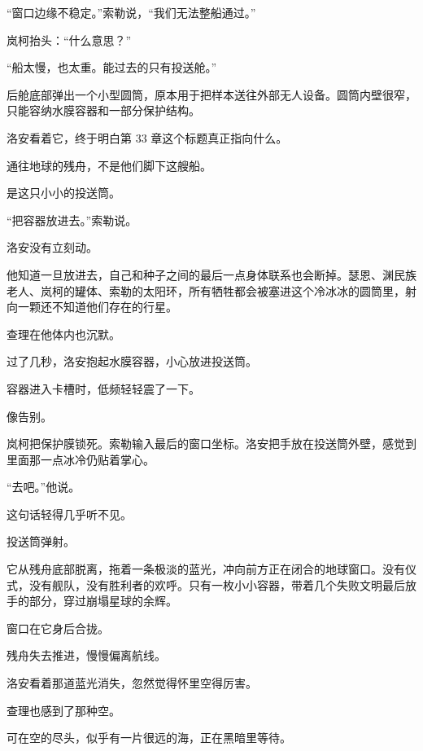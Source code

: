 “窗口边缘不稳定。”索勒说，“我们无法整船通过。”

岚柯抬头：“什么意思？”

“船太慢，也太重。能过去的只有投送舱。”

后舱底部弹出一个小型圆筒，原本用于把样本送往外部无人设备。圆筒内壁很窄，只能容纳水膜容器和一部分保护结构。

洛安看着它，终于明白第 33 章这个标题真正指向什么。

通往地球的残舟，不是他们脚下这艘船。

是这只小小的投送筒。

“把容器放进去。”索勒说。

洛安没有立刻动。

他知道一旦放进去，自己和种子之间的最后一点身体联系也会断掉。瑟恩、渊民族老人、岚柯的罐体、索勒的太阳环，所有牺牲都会被塞进这个冷冰冰的圆筒里，射向一颗还不知道他们存在的行星。

查理在他体内也沉默。

过了几秒，洛安抱起水膜容器，小心放进投送筒。

容器进入卡槽时，低频轻轻震了一下。

像告别。

岚柯把保护膜锁死。索勒输入最后的窗口坐标。洛安把手放在投送筒外壁，感觉到里面那一点冰冷仍贴着掌心。

“去吧。”他说。

这句话轻得几乎听不见。

投送筒弹射。

它从残舟底部脱离，拖着一条极淡的蓝光，冲向前方正在闭合的地球窗口。没有仪式，没有舰队，没有胜利者的欢呼。只有一枚小小容器，带着几个失败文明最后放手的部分，穿过崩塌星球的余辉。

窗口在它身后合拢。

残舟失去推进，慢慢偏离航线。

洛安看着那道蓝光消失，忽然觉得怀里空得厉害。

查理也感到了那种空。

可在空的尽头，似乎有一片很远的海，正在黑暗里等待。
